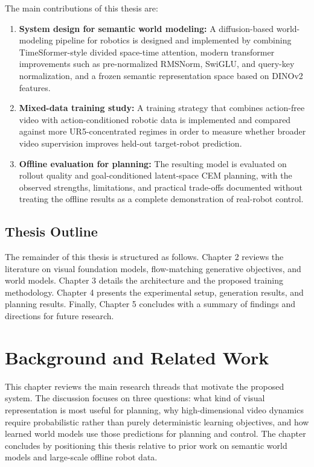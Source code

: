 \documentclass[12pt]{report}
\begin{document}
The main contributions of this thesis are:
\begin{enumerate}
    \item \textbf{System design for semantic world modeling:} A diffusion-based world-modeling pipeline for robotics is designed and implemented by combining TimeSformer-style divided space-time attention, modern transformer improvements such as pre-normalized RMSNorm, SwiGLU, and query-key normalization, and a frozen semantic representation space based on DINOv2 features.
    \item \textbf{Mixed-data training study:} A training strategy that combines action-free video with action-conditioned robotic data is implemented and compared against more UR5-concentrated regimes in order to measure whether broader video supervision improves held-out target-robot prediction.
    \item \textbf{Offline evaluation for planning:} The resulting model is evaluated on rollout quality and goal-conditioned latent-space CEM planning, with the observed strengths, limitations, and practical trade-offs documented without treating the offline results as a complete demonstration of real-robot control.
\end{enumerate}

\section{Thesis Outline}
The remainder of this thesis is structured as follows. Chapter 2 reviews the literature on visual foundation models, flow-matching generative objectives, and world models. Chapter 3 details the architecture and the proposed training methodology. Chapter 4 presents the experimental setup, generation results, and planning results. Finally, Chapter 5 concludes with a summary of findings and directions for future research.

\chapter{Background and Related Work}

\noindent
This chapter reviews the main research threads that motivate the proposed system. The discussion focuses on three questions: what kind of visual representation is most useful for planning, why high-dimensional video dynamics require probabilistic rather than purely deterministic learning objectives, and how learned world models use those predictions for planning and control. The chapter concludes by positioning this thesis relative to prior work on semantic world models and large-scale offline robot data.
\end{document}
